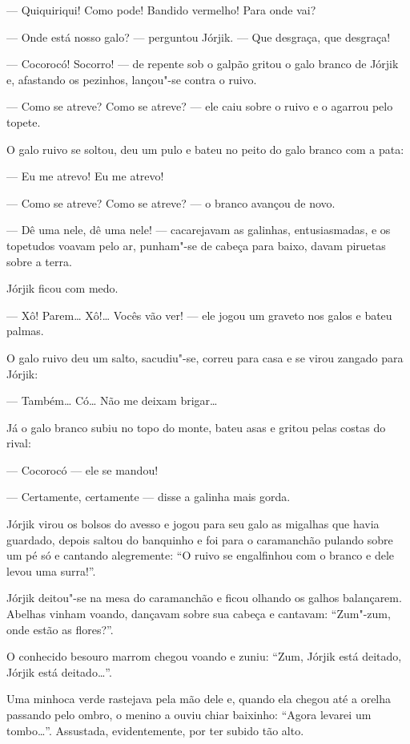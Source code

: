 --- Quiquiriqui! Como pode! Bandido vermelho! Para onde vai?

--- Onde está nosso galo? --- perguntou Jórjik. --- Que desgraça, que
desgraça!

--- Cocorocó! Socorro! --- de repente sob o galpão gritou o galo branco
de Jórjik e, afastando os pezinhos, lançou"-se contra o ruivo.

--- Como se atreve? Como se atreve? --- ele caiu sobre o ruivo e o
agarrou pelo topete.

O galo ruivo se soltou, deu um pulo e bateu no peito do galo branco com
a pata:

--- Eu me atrevo! Eu me atrevo!

--- Como se atreve? Como se atreve? --- o branco avançou de novo.

--- Dê uma nele, dê uma nele! --- cacarejavam as galinhas,
entusiasmadas, e os topetudos voavam pelo ar, punham"-se de cabeça para
baixo, davam piruetas sobre a terra.

Jórjik ficou com medo.

--- Xô! Parem\ldots{} Xô!\ldots{} Vocês vão ver! --- ele jogou um graveto nos
galos e bateu palmas.

O galo ruivo deu um salto, sacudiu"-se, correu para casa e se virou
zangado para Jórjik:

--- Também\ldots{} Có\ldots{} Não me deixam brigar\ldots{}

Já o galo branco subiu no topo do monte, bateu asas e gritou pelas
costas do rival:

--- Cocorocó --- ele se mandou!

--- Certamente, certamente --- disse a galinha mais gorda.

Jórjik virou os bolsos do avesso e jogou para seu galo as migalhas que
havia guardado, depois saltou do banquinho e foi para o caramanchão pulando sobre um pé só e cantando alegremente: ``O ruivo se
engalfinhou com o branco e dele levou uma surra!''.

Jórjik deitou"-se na mesa do caramanchão e ficou olhando os galhos
balançarem. Abelhas vinham voando, dançavam sobre sua cabeça e cantavam:
``Zum"-zum, onde estão as flores?''.

O conhecido besouro marrom chegou voando e zuniu: ``Zum, Jórjik está
deitado, Jórjik está deitado\ldots{}''.

Uma minhoca verde rastejava pela mão dele e, quando ela chegou até a
orelha passando pelo ombro, o menino a ouviu chiar baixinho: ``Agora levarei um
tombo\ldots{}''. Assustada, evidentemente, por ter subido tão alto.

